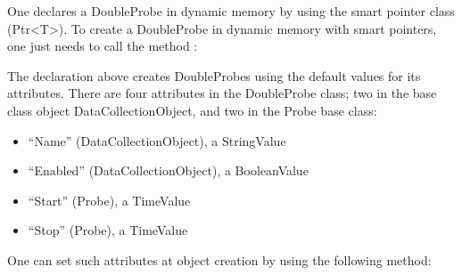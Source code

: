 \documentclass[letterpaper,10pt,english]{sphinxmanual}
\renewcommand{\sphinxcode}[1]{\texttt{\small{#1}}}
\begin{document}
One declares a DoubleProbe in dynamic memory by using the smart pointer class
(Ptr\textless{}T\textgreater{}). To create a DoubleProbe in dynamic memory with smart pointers, one
just needs to call the  method \sphinxcode{}:

\begin{sphinxVerbatim}[commandchars=\\\{\}]
    
\end{sphinxVerbatim}

The declaration above creates DoubleProbes using the default values for its
attributes.  There are four attributes in the DoubleProbe class; two in the
base class object DataCollectionObject, and two in the Probe base class:
\begin{itemize}
\item {} 
“Name” (DataCollectionObject), a StringValue

\item {} 
“Enabled” (DataCollectionObject), a BooleanValue

\item {} 
“Start” (Probe), a TimeValue

\item {} 
“Stop” (Probe), a TimeValue

\end{itemize}

One can set such attributes at object creation by using the following
method:

\begin{sphinxVerbatim}[commandchars=\\\{\}]
    
      
      
       
       
\end{sphinxVerbatim}
\end{document}
